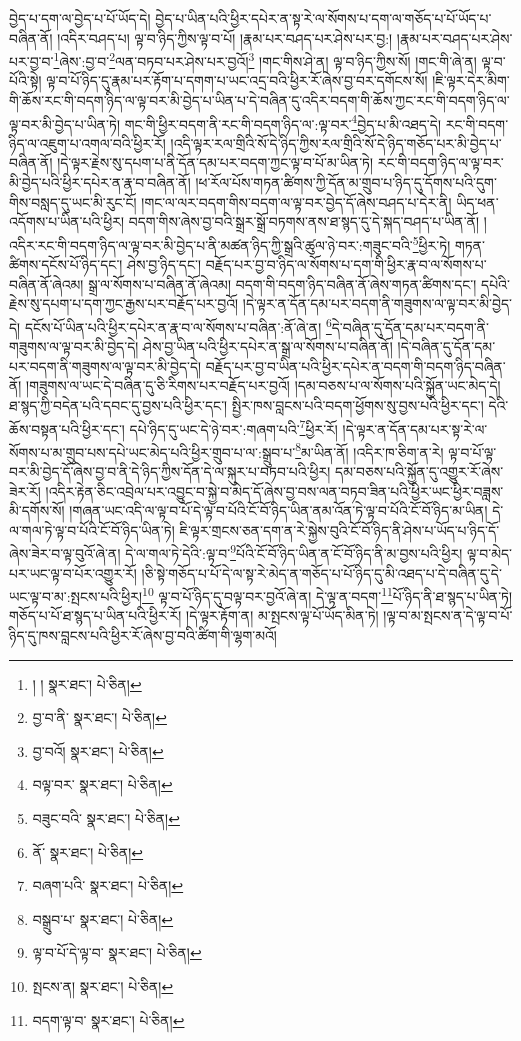 བྱེད་པ་དག་ལ་བྱེད་པ་པོ་ཡོད་དེ། བྱེད་པ་ཡིན་པའི་ཕྱིར་དཔེར་ན་སྟ་རེ་ལ་སོགས་པ་དག་ལ་གཅོད་པ་པོ་ཡོད་པ་བཞིན་ནོ། །འདིར་བཤད་པ། ལྟ་བ་ཉིད་ཀྱིས་ལྟ་བ་པོ། །རྣམ་པར་བཤད་པར་ཤེས་པར་བྱ:། །རྣམ་པར་བཤད་པར་ཤེས་པར་བྱ་བ་\footnote{། །  སྣར་ཐང་།  པེ་ཅིན། }ཞེས་:བྱ་བ་\footnote{བྱ་བ་ནི་  སྣར་ཐང་།  པེ་ཅིན། }ལན་བཏབ་པར་ཤེས་པར་བྱའོ།\footnote{བྱ་བའོ།  སྣར་ཐང་།  པེ་ཅིན། } །གང་གིས་ཤེ་ན། ལྟ་བ་ཉིད་ཀྱིས་སོ། །གང་གི་ཞེ་ན། ལྟ་བ་པོའི་སྟེ། ལྟ་བ་པོ་ཉིད་དུ་རྣམ་པར་རྟོག་པ་དགག་པ་ཡང་འདྲ་བའི་ཕྱིར་རོ་ཞེས་བྱ་བར་དགོངས་སོ། །ཇི་ལྟར་དེར་མིག་གི་ཆོས་རང་གི་བདག་ཉིད་ལ་ལྟ་བར་མི་བྱེད་པ་ཡིན་པ་དེ་བཞིན་དུ་འདིར་བདག་གི་ཆོས་ཀྱང་རང་གི་བདག་ཉིད་ལ་ལྟ་བར་མི་བྱེད་པ་ཡིན་ཏེ། གང་གི་ཕྱིར་བདག་ནི་རང་གི་བདག་ཉིད་ལ་:ལྟ་བར་\footnote{བལྟ་བར་  སྣར་ཐང་།  པེ་ཅིན། }བྱེད་པ་མི་འཐད་དེ། རང་གི་བདག་ཉིད་ལ་འཇུག་པ་འགལ་བའི་ཕྱིར་རོ། །འདི་ལྟར་རལ་གྲིའི་སོ་དེ་ཉིད་ཀྱིས་རལ་གྲིའི་སོ་དེ་ཉིད་གཅོད་པར་མི་བྱེད་པ་བཞིན་ནོ། །དེ་ལྟར་རྗེས་སུ་དཔག་པ་ནི་དོན་དམ་པར་བདག་ཀྱང་ལྟ་བ་པོ་མ་ཡིན་ཏེ། རང་གི་བདག་ཉིད་ལ་ལྟ་བར་མི་བྱེད་པའི་ཕྱིར་དཔེར་ན་རྣ་བ་བཞིན་ནོ། །ཕ་རོལ་པོས་གཏན་ཚིགས་ཀྱི་དོན་མ་གྲུབ་པ་ཉིད་དུ་དོགས་པའི་དུག་གིས་བསླད་དུ་ཡང་མི་རུང་ངོ། །གང་ལ་ལར་བདག་གིས་བདག་ལ་ལྟ་བར་བྱེད་དོ་ཞེས་བཤད་པ་དེར་ནི། ཡིད་ཕན་འདོགས་པ་ཡིན་པའི་ཕྱིར། བདག་གིས་ཞེས་བྱ་བའི་སྒྲར་སྒྲོ་བཏགས་ནས་ཐ་སྙད་དུ་དེ་སྐད་བཤད་པ་ཡིན་ནོ། །འདིར་རང་གི་བདག་ཉིད་ལ་ལྟ་བར་མི་བྱེད་པ་ནི་མཚན་ཉིད་ཀྱི་སྒྲའི་ཚུལ་ཉེ་བར་:གཟུང་བའི་\footnote{བཟུང་བའི་  སྣར་ཐང་།  པེ་ཅིན། }ཕྱིར་ཏེ། གཏན་ཚིགས་དངོས་པོ་ཉིད་དང་། ཤེས་བྱ་ཉིད་དང་། བརྗོད་པར་བྱ་བ་ཉིད་ལ་སོགས་པ་དག་གི་ཕྱིར་རྣ་བ་ལ་སོགས་པ་བཞིན་ནོ་ཞེའམ། སྒྲ་ལ་སོགས་པ་བཞིན་ནོ་ཞེའམ། བདག་གི་བདག་ཉིད་བཞིན་ནོ་ཞེས་གཏན་ཚིགས་དང་། དཔེའི་རྗེས་སུ་དཔག་པ་དག་ཀྱང་རྒྱས་པར་བརྗོད་པར་བྱའོ། །དེ་ལྟར་ན་དོན་དམ་པར་བདག་ནི་གཟུགས་ལ་ལྟ་བར་མི་བྱེད་དེ། དངོས་པོ་ཡིན་པའི་ཕྱིར་དཔེར་ན་རྣ་བ་ལ་སོགས་པ་བཞིན་:ནོ་ཞེ་ན། \footnote{ནོ་  སྣར་ཐང་།  པེ་ཅིན། }དེ་བཞིན་དུ་དོན་དམ་པར་བདག་ནི་གཟུགས་ལ་ལྟ་བར་མི་བྱེད་དེ། ཤེས་བྱ་ཡིན་པའི་ཕྱིར་དཔེར་ན་སྒྲ་ལ་སོགས་པ་བཞིན་ནོ། །དེ་བཞིན་དུ་དོན་དམ་པར་བདག་ནི་གཟུགས་ལ་ལྟ་བར་མི་བྱེད་དེ། བརྗོད་པར་བྱ་བ་ཡིན་པའི་ཕྱིར་དཔེར་ན་བདག་གི་བདག་ཉིད་བཞིན་ནོ། །གཟུགས་ལ་ཡང་དེ་བཞིན་དུ་ཅི་རིགས་པར་བརྗོད་པར་བྱའོ། །དམ་བཅས་པ་ལ་སོགས་པའི་སྐྱོན་ཡང་མེད་དེ། ཐ་སྙད་ཀྱི་བདེན་པའི་དབང་དུ་བྱས་པའི་ཕྱིར་དང་། སྤྱིར་ཁས་བླངས་པའི་བདག་ཕྱོགས་སུ་བྱས་པའི་ཕྱིར་དང་། དེའི་ཆོས་བསྟན་པའི་ཕྱིར་དང་། དཔེ་ཉིད་དུ་ཡང་དེ་ཉེ་བར་:གཞག་པའི་\footnote{བཞག་པའི་  སྣར་ཐང་།  པེ་ཅིན། }ཕྱིར་རོ། །དེ་ལྟར་ན་དོན་དམ་པར་སྟ་རེ་ལ་སོགས་པ་མ་གྲུབ་པས་དཔེ་ཡང་མེད་པའི་ཕྱིར་གྲུབ་པ་ལ་:སྒྲུབ་པ་\footnote{བསྒྲུབ་པ་  སྣར་ཐང་།  པེ་ཅིན། }མ་ཡིན་ནོ། །འདིར་ཁ་ཅིག་ན་རེ། ལྟ་བ་པོ་ལྟ་བར་མི་བྱེད་དོ་ཞེས་བྱ་བ་ནི་དེ་ཉིད་ཀྱིས་དོན་དེ་ལ་སྐུར་པ་བཏབ་པའི་ཕྱིར། དམ་བཅས་པའི་སྐྱོན་དུ་འགྱུར་རོ་ཞེས་ཟེར་རོ། །འདིར་རྟེན་ཅིང་འབྲེལ་པར་འབྱུང་བ་སྐྱེ་བ་མེད་དོ་ཞེས་བྱ་བས་ལན་བཏབ་ཟིན་པའི་ཕྱིར་ཡང་ཕྱིར་བཟླས་མི་དགོས་སོ། །གཞན་ཡང་འདི་ལ་ལྟ་བ་པོ་དེ་ལྟ་བ་པོའི་ངོ་བོ་ཉིད་ཡིན་ནམ་འོན་ཏེ་ལྟ་བ་པོའི་ངོ་བོ་ཉིད་མ་ཡིན། དེ་ལ་གལ་ཏེ་ལྟ་བ་པོའི་ངོ་བོ་ཉིད་ཡིན་ཏེ། ཇི་ལྟར་གྲངས་ཅན་དག་ན་རེ་སྐྱེས་བུའི་ངོ་བོ་ཉིད་ནི་ཤེས་པ་ཡོད་པ་ཉིད་དོ་ཞེས་ཟེར་བ་ལྟ་བུའོ་ཞེ་ན། དེ་ལ་གལ་ཏེ་དེའི་:ལྟ་བ་\footnote{ལྟ་བ་པོ་དེ་ལྟ་བ་  སྣར་ཐང་།  པེ་ཅིན། }པོའི་ངོ་བོ་ཉིད་ཡིན་ན་ངོ་བོ་ཉིད་ནི་མ་བྱས་པའི་ཕྱིར། ལྟ་བ་མེད་པར་ཡང་ལྟ་བ་པོར་འགྱུར་རོ། །ཅི་སྟེ་གཅོད་པ་པོ་དེ་ལ་སྟ་རེ་མེད་ན་གཅོད་པ་པོ་ཉིད་དུ་མི་འཐད་པ་དེ་བཞིན་དུ་དེ་ཡང་ལྟ་བ་མ་:སྤངས་པའི་ཕྱིར།\footnote{སྤངས་ན།  སྣར་ཐང་།  པེ་ཅིན། } ལྟ་བ་པོ་ཉིད་དུ་བལྟ་བར་བྱའོ་ཞེ་ན། དེ་ལྟ་ན་བདག་\footnote{བདག་ལྟ་བ་  སྣར་ཐང་།  པེ་ཅིན། }པོ་ཉིད་ནི་ཐ་སྙད་པ་ཡིན་ཏེ། གཅོད་པ་པོ་ཐ་སྙད་པ་ཡིན་པའི་ཕྱིར་རོ། །དེ་ལྟར་རྟོག་ན། མ་སྤངས་ལྟ་པོ་ཡོད་མིན་ཏེ། །ལྟ་བ་མ་སྤངས་ན་དེ་ལྟ་བ་པོ་ཉིད་དུ་ཁས་བླངས་པའི་ཕྱིར་རོ་ཞེས་བྱ་བའི་ཚིག་གི་ལྷག་མའོ། 
